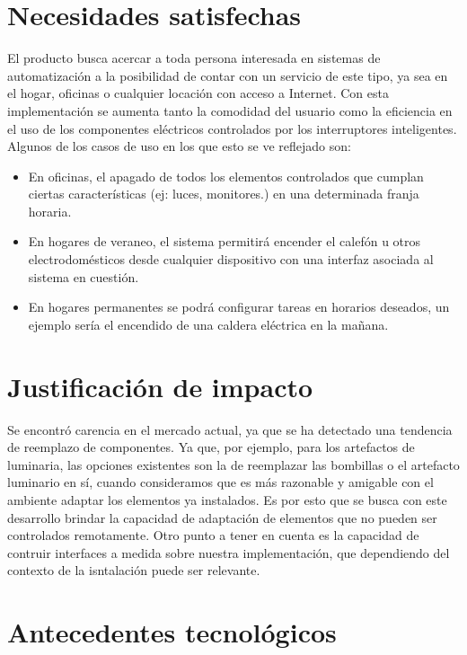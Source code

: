 \section{Necesidades satisfechas}
El producto busca acercar a toda persona interesada en sistemas de automatización a la posibilidad de contar con un servicio de este tipo, ya sea en el hogar, oficinas o cualquier locación con acceso a Internet.
Con esta implementación se aumenta tanto la comodidad del usuario como la eficiencia en el uso de los componentes eléctricos controlados por los interruptores inteligentes. Algunos de los casos de uso en los que esto se ve reflejado son:

\begin{itemize}
	\item En oficinas, el apagado de todos los elementos controlados que cumplan ciertas características (ej: luces, monitores.) en una determinada franja horaria.
	\item En hogares de veraneo, el sistema permitirá encender el calefón u otros electrodomésticos desde cualquier dispositivo con una interfaz asociada al sistema en cuestión.
	\item En hogares permanentes se podrá configurar tareas en horarios deseados, un ejemplo sería el encendido de una caldera eléctrica en la mañana.
\end{itemize}

\section{Justificación de impacto}

Se encontró carencia en el mercado actual, ya que se ha detectado una tendencia de reemplazo de componentes. Ya que, por ejemplo, para los artefactos de luminaria, las opciones existentes son la de reemplazar las bombillas o el artefacto luminario en sí, cuando consideramos que es más razonable y amigable con el ambiente adaptar los elementos ya instalados. Es por esto que se busca con este desarrollo brindar la capacidad de adaptación de elementos que no pueden ser controlados remotamente.
Otro punto a tener en cuenta es la capacidad de contruir interfaces a medida sobre nuestra implementación, que dependiendo del contexto de la isntalación puede ser relevante.

\section{Antecedentes tecnológicos}

